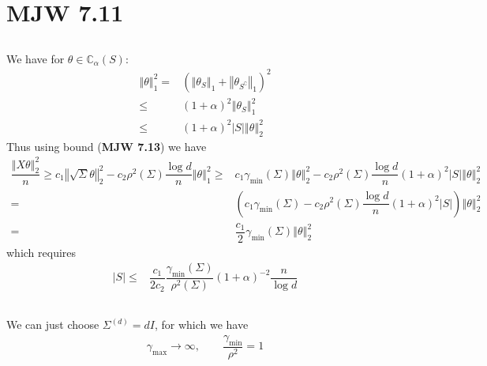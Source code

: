 \documentclass[11pt,a4paper]{ctexart}
\numberwithin{equation}{section}%
\begin{document}
\section{MJW 7.11}

\subsection{}

We have for $ \theta \in \mathbb{C}_\alpha (S) $:
\begin{align*}
    \left\Vert \theta  \right\Vert _1^2= & (\left\Vert \theta _S \right\Vert _1 + \left\Vert \theta _{S^\complement} \right\Vert _1 )^2\\
    \leq& ( 1+\alpha )^2 \left\Vert \theta _S  \right\Vert _1^2\\
    \leq& ( 1+\alpha )^2 \left\vert S  \right\vert  \left\Vert \theta  \right\Vert _2^2
\end{align*}
Thus using bound (\textbf{MJW 7.13}) we have 
\begin{align*}
     \dfrac{ \left\Vert X\theta  \right\Vert _2^2  }{ n  } \geq c_1\left\Vert \sqrt{\Sigma }\theta  \right\Vert _2^2 - c_2\rho ^2(\Sigma )\dfrac{ \log d  }{ n  } \left\Vert \theta  \right\Vert _1^2 \geq & c_1\gamma _{\min} (\Sigma )\left\Vert \theta  \right\Vert _2^2 - c_2\rho ^2(\Sigma )\dfrac{ \log d  }{ n  }(1+\alpha)^2\left\vert S  \right\vert \left\Vert \theta  \right\Vert _2^2 \\
     =& \left( c_1\gamma _{\min} (\Sigma ) - c_2\rho ^2(\Sigma )\dfrac{ \log d  }{ n  }(1+\alpha)^2\left\vert S  \right\vert  \right)\left\Vert \theta  \right\Vert _2^2 \\
     =& \dfrac{ c_1 }{ 2 } \gamma _{\min} (\Sigma )\left\Vert \theta  \right\Vert _2^2
\end{align*}
which requires
\begin{align*}
    \left\vert S  \right\vert \leq & \dfrac{ c_1 }{ 2c_2 } \dfrac{ \gamma _{\min} (\Sigma ) }{ \rho ^2(\Sigma ) }(1+\alpha)^{-2}\dfrac{ n }{ \log d } 
\end{align*}

\subsection{}

We can just choose $ \Sigma ^{(d)}= dI $, for which we have
\begin{align*}
    \gamma _{\max}\to \infty ,\qquad \dfrac{ \gamma _{\min} }{ \rho ^2 } = 1  
\end{align*}
\end{document}
